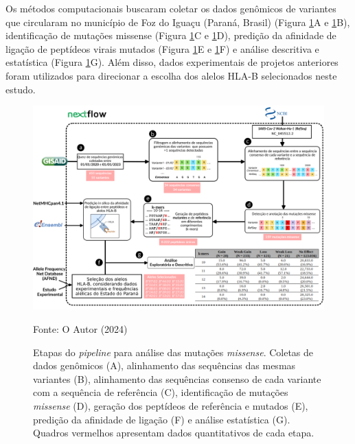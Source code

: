 \begin{justify}
Os métodos computacionais buscaram coletar os dados genômicos de variantes que circularam no município de Foz do Iguaçu (Paraná, Brasil) (Figura \ref{fig:fig5}A e \ref{fig:fig5}B), identificação de mutações missense (Figura \ref{fig:fig5}C e \ref{fig:fig5}D), predição da afinidade de ligação de peptídeos virais mutados (Figura \ref{fig:fig5}E e \ref{fig:fig5}F) e análise descritiva e estatística (Figura \ref{fig:fig5}G). Além disso, dados experimentais de projetos anteriores foram utilizados para direcionar a escolha dos alelos HLA-B selecionados neste estudo.

\begin{figure}
    \centering
    \caption{\justifying Etapas do \textit{pipeline} para análise das mutações \textit{missense}. Coletas de dados genômicos (A), alinhamento das sequências das mesmas variantes (B), alinhamento das sequências consenso de cada variante com a sequência de referência (C), identificação de mutações \textit{missense} (D), geração dos peptídeos de referência e mutados (E), predição da afinidade de ligação (F) e análise estatística (G). Quadros vermelhos apresentam dados quantitativos de cada etapa. }
    \includegraphics[width=1\textwidth]{Figuras/fig5.png}
    \label{fig:fig5}
    \begin{minipage}{0.8\textwidth} %
        \centering
        \footnotesize Fonte: O Autor (2024)
    \end{minipage}
\end{figure}

\begin{figure}
\end{figure}


\end{justify}
